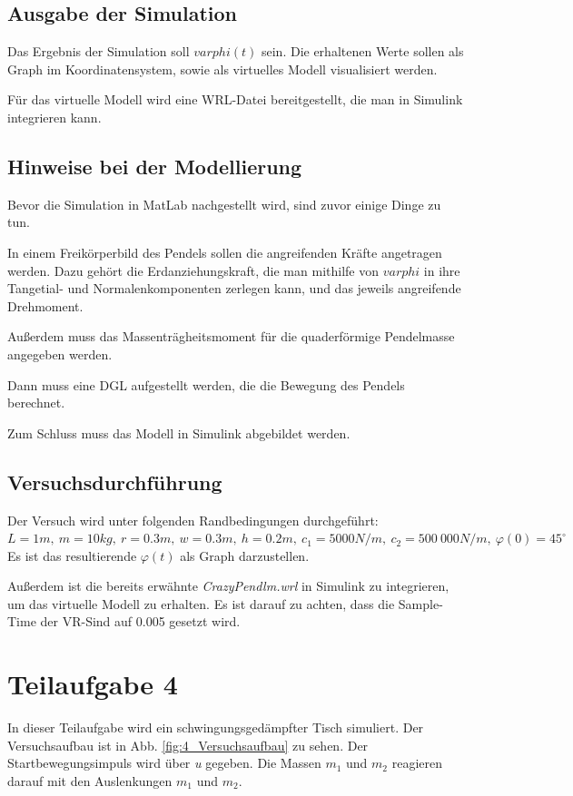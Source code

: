 \documentclass[]{scrartcl}
\begin{document}
\subsection{Ausgabe der Simulation}
Das Ergebnis der Simulation soll $varphi(t)$ sein. Die erhaltenen Werte sollen als Graph im Koordinatensystem, sowie als virtuelles Modell visualisiert werden.

Für das virtuelle Modell wird eine WRL-Datei bereitgestellt, die man in Simulink integrieren kann.

\subsection{Hinweise bei der Modellierung}
Bevor die Simulation in MatLab nachgestellt wird, sind zuvor einige Dinge zu tun.

In einem Freikörperbild des Pendels sollen die angreifenden Kräfte angetragen werden. Dazu gehört die Erdanziehungskraft, die man mithilfe von $varphi$ in ihre Tangetial- und Normalenkomponenten zerlegen kann, und das jeweils angreifende Drehmoment.

Außerdem muss das Massenträgheitsmoment für die quaderförmige Pendelmasse angegeben werden.

Dann muss eine DGL aufgestellt werden, die die Bewegung des Pendels berechnet.

Zum Schluss muss das Modell in Simulink abgebildet werden.

\subsection{Versuchsdurchführung}
Der Versuch wird unter folgenden Randbedingungen durchgeführt: $L=1m,\ m=10kg,\ r=0.3m,\ w=0.3m,\ h=0.2m,\ c_{1}=5000N/m,\ c_{2}=500\ 000N/m,\ \varphi(0)=45^\circ$
Es ist das resultierende $\varphi(t)$ als Graph darzustellen.

Außerdem ist die bereits erwähnte \textit{CrazyPendlm.wrl} in Simulink zu integrieren, um das virtuelle Modell zu erhalten. Es ist darauf zu achten, dass die Sample-Time der VR-Sind auf 0.005 gesetzt wird.

\section{Teilaufgabe 4}
In dieser Teilaufgabe wird ein schwingungsgedämpfter Tisch simuliert. Der Versuchsaufbau ist in Abb. \ref{fig:4_Versuchsaufbau} zu sehen. Der Startbewegungsimpuls wird über \textit{u} gegeben. Die Massen $m_{1}$ und $m_{2}$ reagieren darauf mit den Auslenkungen $m_{1}$ und $m_{2}$.
\end{document}
